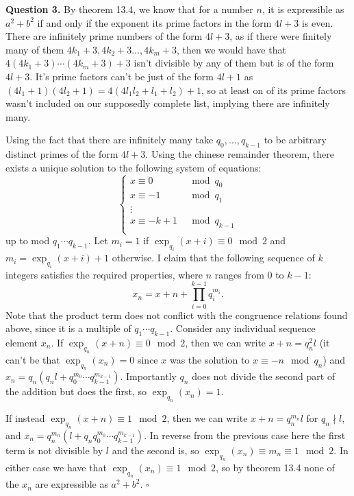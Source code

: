 \documentclass[letterpaper, reqno,11pt]{article}
\begin{document}
{\medskip\noindent\bf Question 3.} By theorem 13.4, we know that for a number $n$, it is expressible as $a^2+b^2$ if and only if the exponent its prime factors in the form $4l+3$ is even. There are infinitely prime numbers of the form $4l+3$, as if there were finitely many of them $4k_1+3,4k_2+3\ldots, 4k_m+3$, then we would have that $4(4k_1+3)\cdots (4k_m+3)+3$ isn't divisible by any of them but is of the form $4l+3$. It's prime factors can't be just of the form $4l+1$ as $(4l_1+1)(4l_2+1)=4(4l_1l_2+l_1+l_2)+1$, so at least on of its prime factors wasn't included on our supposedly complete list, implying there are infinitely many.

Using the fact that there are infinitely many take $q_0,\ldots, q_{k-1}$ to be arbitrary distinct primes of the form $4l+3$. Using the chinese remainder theorem, there exists a unique solution to the following system of equations:
\[
\begin{cases}
    
    x\equiv 0&\mod q_0\\
    x\equiv -1&\mod q_1\\
\vdots\\
    x\equiv -k+1&\mod q_{k-1}\\
\end{cases}
\]
up to mod $q_1\cdots q_{k-1}$. Let $m_i=1$ if $\exp_{q_i}(x+i)\equiv 0\mod 2$ and $m_i=\exp_{q_i}(x+i)+1$ otherwise. I claim that the following sequence of $k$ integers satisfies the required properties, where $n$ ranges from 0 to $k-1$:
\[
    x_n=x+n+\prod_{i=0}^{k-1}q_i^{m_i}
.\]
Note that the product term does not conflict with the congruence relations found above, since it is a multiple of $q_1\cdots q_{k-1}$. Consider any individual sequence element $x_n$. If $\exp_{q_{n}}(x+n)\equiv 0\mod 2$, then we can write $x+n=q_n^2l$ (it can't be that $\exp_{q_n}(x_n)=0$ since $x$ was the solution to $x\equiv -n\mod q_n$) and $x_n=q_n(q_nl+q_0^{m_0}\cdots q_{k-1}^{m_{k-1}})$. Importantly $q_n$ does not divide the second part of the addition but does the first, so $\exp_{q_n}(x_n)=1$.

If instead $\exp_{q_{n}}(x+n)\equiv 1\mod 2$, then we can write $x+n=q_n^{m_n}l$ for $q_n\nmid l$, and $x_n=q_n^{m_n}(l+q_nq_0^{m_0}\cdots q_{k-1}^{m_{k-1}})$. In reverse from the previous case here the first term is not divisible by $l$ and the second is, so $\exp_{q_n}(x_n)\equiv m_n\equiv 1\mod 2$. In either case we have that $\exp_{q_n}(x_n)\equiv 1\mod 2$, so by theorem 13.4 none of the $x_n$ are expressible as $a^2+b^2$. $\square$
\end{document}
